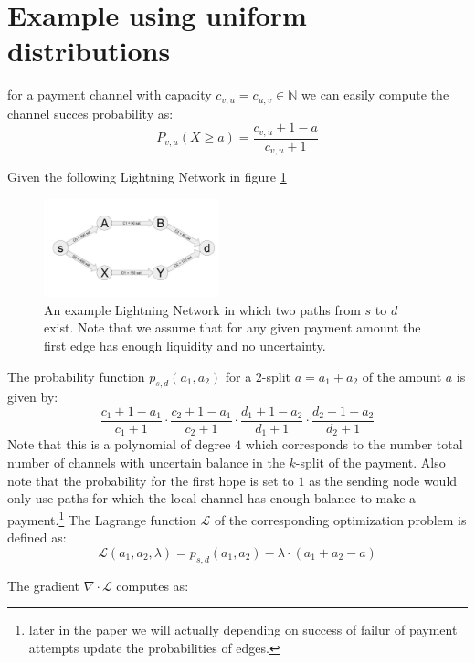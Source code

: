 \documentclass[10pt,twocolumn]{article}
\begin{document}
\section{Example using uniform distributions}
for a payment channel with capacity $c_{v,u}=c_{u,v}\in\mathbb{N}$ we can easily compute the channel succes probability as:
\[
P_{v,u}(X\geq a)=\frac{c_{v,u}+1 - a}{c_{v,u}+1}
\]

Given the following Lightning Network in figure \ref{fig:example_LN}
\begin{figure}[htpb]
  \center
  \includegraphics[width=0.45\textwidth]{img/example_LN.jpg}
  \caption{An example Lightning Network in which two paths from $s$ to $d$ exist. Note that we assume that for any given payment amount the first edge has enough liquidity and no uncertainty.}
  \label{fig:example_LN}
\end{figure}
The probability function $p_{s,d}(a_1,a_2)$ for a $2$-split $a=a_1+a_2$ of the amount $a$ is given by:
\[
\frac{c_1+1 - a_1}{c_1+1}\cdot\frac{c_2+1 - a_1}{c_2+1}\cdot\frac{d_1+1 - a_2}{d_1+1}\cdot\frac{d_2+1 - a_2}{d_2+1} 
\]
Note that this is a polynomial of degree $4$ which corresponds to the number total number of channels with uncertain balance in the $k$-split of the payment.
Also note that the probability for the first hope is set to $1$ as the sending node would only use paths for which the local channel has enough balance to make a payment.\footnote{later in the paper we will actually depending on success of failur of payment attempts update the probabilities of edges.}
The Lagrange function $\mathcal{L}$ of the corresponding optimization problem is defined as:
\[
\mathcal{L}(a_1,a_2,\lambda)=p_{s,d}(a_1,a_2) - \lambda\cdot(a_1+a_2-a)
\]

The gradient $\nabla\cdot\mathcal{L}$ computes as:
\end{document}
